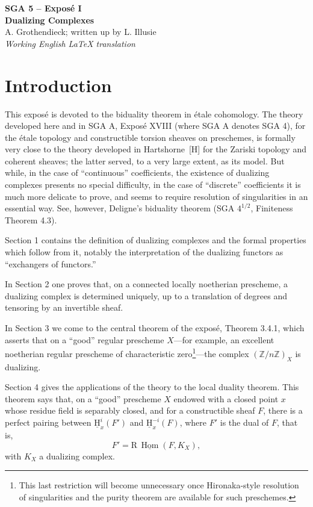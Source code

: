 \documentclass[12pt]{article}
\newcommand{\ZZ}{\mathbb Z}
\newcommand{\Hom}{\operatorname{Hom}}
\newcommand{\R}{\mathrm R}
\newcommand{\Hh}{\mathrm H}
\begin{document}
\begin{center}
{\Large \textbf{SGA 5 -- Exposé I}}\\[0.4em]
{\large \textbf{Dualizing Complexes}}\\[0.3em]
A. Grothendieck; written up by L. Illusie\\[0.4em]
\emph{Working English LaTeX translation}\
\end{center}

\section*{Introduction}

This exposé is devoted to the biduality theorem in étale cohomology. The theory developed here and in SGA A, Exposé XVIII (where SGA A denotes SGA 4), for the étale topology and constructible torsion sheaves on preschemes, is formally very close to the theory developed in Hartshorne~[H] for the Zariski topology and coherent sheaves; the latter served, to a very large extent, as its model. But while, in the case of ``continuous'' coefficients, the existence of dualizing complexes presents no special difficulty, in the case of ``discrete'' coefficients it is much more delicate to prove, and seems to require resolution of singularities in an essential way. See, however, Deligne's biduality theorem (SGA $4^{1/2}$, Finiteness Theorem 4.3).

Section 1 contains the definition of dualizing complexes and the formal properties which follow from it, notably the interpretation of the dualizing functors as ``exchangers of functors.''

In Section 2 one proves that, on a connected locally noetherian prescheme, a dualizing complex is determined uniquely, up to a translation of degrees and tensoring by an invertible sheaf.

In Section 3 we come to the central theorem of the exposé, Theorem 3.4.1, which asserts that on a ``good'' regular prescheme $X$---for example, an excellent noetherian regular prescheme of characteristic zero\footnote{This last restriction will become unnecessary once Hironaka-style resolution of singularities and the purity theorem are available for such preschemes.}---the complex $(\ZZ/n\ZZ)_X$ is dualizing.

Section 4 gives the applications of the theory to the local duality theorem. This theorem says that, on a ``good'' prescheme $X$ endowed with a closed point $x$ whose residue field is separably closed, and for a constructible sheaf $F$, there is a perfect pairing between $\underline{\Hh}^i_x(F')$ and $\underline{\Hh}^{-i}_x(F)$, where $F'$ is the dual of $F$, that is,
\[
   F'=\R\,\underline{\Hom}(F,K_X),
\]
with $K_X$ a dualizing complex.
\end{document}
